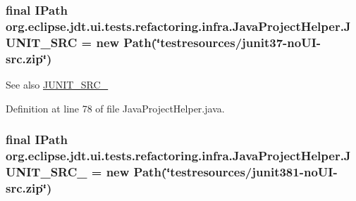 \hypertarget{classorg_1_1eclipse_1_1jdt_1_1ui_1_1tests_1_1refactoring_1_1infra_1_1JavaProjectHelper_af51571e2c282dc955d763c8aa6d74d0b}{
\subsubsection[{JUNIT\_\-SRC}]{\setlength{\rightskip}{0pt plus 5cm}final IPath {\bf org.eclipse.jdt.ui.tests.refactoring.infra.JavaProjectHelper.JUNIT\_\-SRC} = new Path(\char`\"{}testresources/junit37-\/noUI-\/src.zip\char`\"{})}}
\label{classorg_1_1eclipse_1_1jdt_1_1ui_1_1tests_1_1refactoring_1_1infra_1_1JavaProjectHelper_af51571e2c282dc955d763c8aa6d74d0b}
\begin{DoxySeeAlso}{See also}
\hyperlink{classorg_1_1eclipse_1_1jdt_1_1ui_1_1tests_1_1refactoring_1_1infra_1_1JavaProjectHelper_a31fe8a61eb699994d99273c9d3996172}{JUNIT\_\-SRC\_} 
\end{DoxySeeAlso}


Definition at line 78 of file JavaProjectHelper.java.

\hypertarget{classorg_1_1eclipse_1_1jdt_1_1ui_1_1tests_1_1refactoring_1_1infra_1_1JavaProjectHelper_a31fe8a61eb699994d99273c9d3996172}{
\subsubsection[{JUNIT\_\-SRC\_\-381}]{\setlength{\rightskip}{0pt plus 5cm}final IPath {\bf org.eclipse.jdt.ui.tests.refactoring.infra.JavaProjectHelper.JUNIT\_\-SRC\_} = new Path(\char`\"{}testresources/junit381-\/noUI-\/src.zip\char`\"{})}}
\label{classorg_1_1eclipse_1_1jdt_1_1ui_1_1tests_1_1refactoring_1_1infra_1_1JavaProjectHelper_a31fe8a61eb699994d99273c9d3996172}


